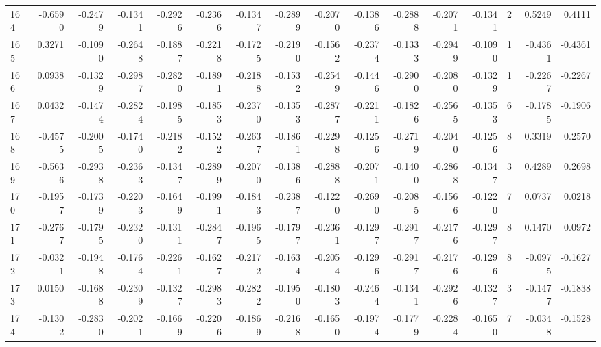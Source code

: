 \begin{tabular}{lrrrrrrrrrrrrrrr}
164 &     -0.6590 & -0.2479 & -0.1341 & -0.2926 & -0.2366 & -0.1347 & -0.2899 & -0.2070 & -0.1386 & -0.2888 &  -0.2071 &    -0.1341 &      2 &                    0.5249 &                     0.4111 \\
165 &      0.3271 & -0.1090 & -0.2648 & -0.1887 & -0.2218 & -0.1725 & -0.2190 & -0.1562 & -0.2374 & -0.1333 &  -0.2949 &    -0.1090 &      1 &                   -0.4361 &                    -0.4361 \\
166 &      0.0938 & -0.1329 & -0.2987 & -0.2820 & -0.1891 & -0.2188 & -0.1532 & -0.2549 & -0.1446 & -0.2900 &  -0.2080 &    -0.1329 &      1 &                   -0.2267 &                    -0.2267 \\
167 &      0.0432 & -0.1474 & -0.2824 & -0.1985 & -0.1853 & -0.2370 & -0.1353 & -0.2877 & -0.2211 & -0.1826 &  -0.2565 &    -0.1353 &      6 &                   -0.1785 &                    -0.1906 \\
168 &     -0.4575 & -0.2005 & -0.1740 & -0.2182 & -0.1522 & -0.2637 & -0.1861 & -0.2298 & -0.1256 & -0.2719 &  -0.2040 &    -0.1256 &      8 &                    0.3319 &                     0.2570 \\
169 &     -0.5636 & -0.2938 & -0.2363 & -0.1347 & -0.2899 & -0.2070 & -0.1386 & -0.2888 & -0.2071 & -0.1400 &  -0.2868 &    -0.1347 &      3 &                    0.4289 &                     0.2698 \\
170 &     -0.1957 & -0.1739 & -0.2203 & -0.1649 & -0.1991 & -0.1843 & -0.2387 & -0.1220 & -0.2690 & -0.2085 &  -0.1566 &    -0.1220 &      7 &                    0.0737 &                     0.0218 \\
171 &     -0.2767 & -0.1795 & -0.2320 & -0.1311 & -0.2847 & -0.1965 & -0.1797 & -0.2361 & -0.1297 & -0.2917 &  -0.2176 &    -0.1297 &      8 &                    0.1470 &                     0.0972 \\
172 &     -0.0321 & -0.1948 & -0.1764 & -0.2261 & -0.1627 & -0.2172 & -0.1634 & -0.2054 & -0.1296 & -0.2917 &  -0.2176 &    -0.1296 &      8 &                   -0.0975 &                    -0.1627 \\
173 &      0.0150 & -0.1688 & -0.2309 & -0.1327 & -0.2983 & -0.2822 & -0.1950 & -0.1803 & -0.2464 & -0.1341 &  -0.2926 &    -0.1327 &      3 &                   -0.1477 &                    -0.1838 \\
174 &     -0.1302 & -0.2830 & -0.2021 & -0.1669 & -0.2206 & -0.1869 & -0.2168 & -0.1650 & -0.1974 & -0.1779 &  -0.2284 &    -0.1650 &      7 &                   -0.0348 &                    -0.1528 \\

\end{tabular}
